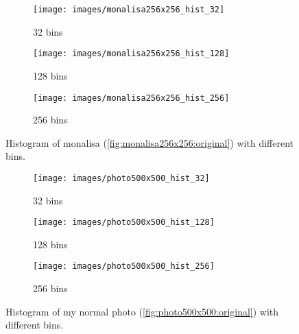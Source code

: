 \documentclass[journal]{IEEEtran}
\begin{document}
\begin{figure}
	\centering
	\begin{subfigure}{0.15\textwidth}
		\centering
		\texttt{[image: images/monalisa256x256\_hist\_32]} 
		\caption{32 bins}
		\label{fig:monalisa256x256:hist:32}
	\end{subfigure}
	\centering
	\begin{subfigure}{0.15\textwidth}
		\centering
		\texttt{[image: images/monalisa256x256\_hist\_128]} 
		\caption{128 bins}
		\label{fig:monalisa256x256:hist:128}
	\end{subfigure}
	\centering
	\begin{subfigure}{0.15\textwidth}
		\centering
		\texttt{[image: images/monalisa256x256\_hist\_256]} 
		\caption{256 bins}
		\label{fig:monalisa256x256:hist:256}
	\end{subfigure}
	
	\caption{Histogram of monalisa (\ref{fig:monalisa256x256:original}) with different bins.}
	\label{fig:monalisa256x256:hist}
\end{figure}


\begin{figure}
	\centering
	\begin{subfigure}{0.15\textwidth}
		\centering
		\texttt{[image: images/photo500x500\_hist\_32]} 
		\caption{32 bins}
		\label{fig:photo500x500:hist:32}
	\end{subfigure}
	\centering
	\begin{subfigure}{0.15\textwidth}
		\centering
		\texttt{[image: images/photo500x500\_hist\_128]} 
		\caption{128 bins}
		\label{fig:photo500x500:hist:128}
	\end{subfigure}
	\centering
	\begin{subfigure}{0.15\textwidth}
		\centering
		\texttt{[image: images/photo500x500\_hist\_256]} 
		\caption{256 bins}
		\label{fig:photo500x500:hist:256}
	\end{subfigure}
	
	\caption{Histogram of my normal photo (\ref{fig:photo500x500:original}) with different bins.}
	\label{fig:photo500x500:hist}
\end{figure}
\end{document}
